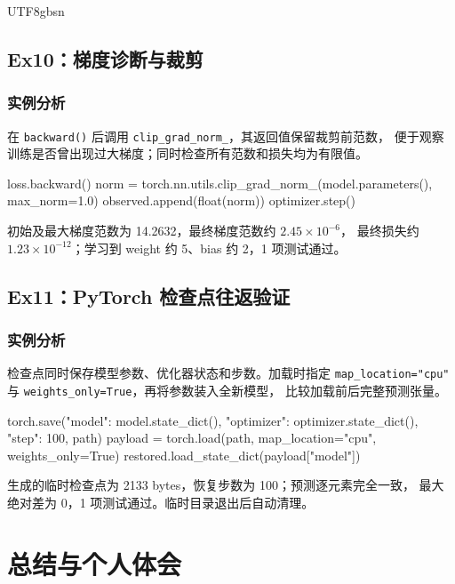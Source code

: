 \documentclass[11pt]{article}
\begin{document}
\begin{CJK*}{UTF8}{gbsn}
\subsection{Ex10：梯度诊断与裁剪}
\subsubsection{实例分析}
在 \texttt{backward()} 后调用 \texttt{clip\_grad\_norm\_}，其返回值保留裁剪前范数，
便于观察训练是否曾出现过大梯度；同时检查所有范数和损失均为有限值。
\begin{CodeBlock}
loss.backward()
norm = torch.nn.utils.clip_grad_norm_(model.parameters(), max_norm=1.0)
observed.append(float(norm))
optimizer.step()
\end{CodeBlock}
\begin{resultbox}
初始及最大梯度范数为 14.2632，最终梯度范数约 $2.45\times10^{-6}$，
最终损失约 $1.23\times10^{-12}$；学习到 weight 约 5、bias 约 2，1 项测试通过。
\end{resultbox}

\clearpage
\subsection{Ex11：PyTorch 检查点往返验证}
\subsubsection{实例分析}
检查点同时保存模型参数、优化器状态和步数。加载时指定
\texttt{map\_location="cpu"} 与 \texttt{weights\_only=True}，再将参数装入全新模型，
比较加载前后完整预测张量。
\begin{CodeBlock}
torch.save({"model": model.state_dict(),
            "optimizer": optimizer.state_dict(), "step": 100}, path)
payload = torch.load(path, map_location="cpu", weights_only=True)
restored.load_state_dict(payload["model"])
\end{CodeBlock}
\begin{resultbox}
生成的临时检查点为 2133 bytes，恢复步数为 100；预测逐元素完全一致，
最大绝对差为 0，1 项测试通过。临时目录退出后自动清理。
\end{resultbox}

\clearpage
\section{总结与个人体会}


\end{CJK*}
\end{document}
